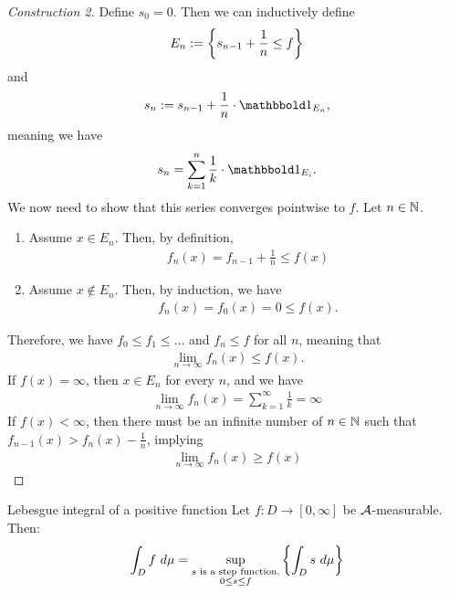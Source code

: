 \begin{proof}[Construction 2]
	Define $s_0 = 0$. Then we can inductively define
	\begin{align*}
		E_n := \qty{s_{n-1} + \frac{1}{n} \leq f}
	\end{align*}
	and
	\begin{align*}
		s_n := s_{n-1} + \frac{1}{n} \cdot \boldone_{E_n},
	\end{align*}
	meaning we have
	\begin{align*}
		s_n = \sum_{k = 1}^n \frac{1}{k} \cdot \boldone_{E_i}.
	\end{align*}
	We now need to show that this series converges pointwise to $f$. Let $n \in \mathbb{N}$.
	\begin{enumerate}
		\item Assume $x \in E_n$. Then, by definition, 
		\begin{align*}
			f_n(x) = f_{n - 1} + \frac{1}{n} \leq f(x)
		\end{align*}
		\item Assume $x \notin E_n$. Then, by induction, we have
		\begin{align*}
			f_n(x) = f_{0}(x) = 0 \leq f(x).
		\end{align*}
	\end{enumerate}
	Therefore, we have $f_0 \leq f_1 \leq \hdots$ and $f_n \leq f$ for all $n$, meaning that
	\begin{align*}
		\lim_{n \to \infty} f_n(x) \leq f(x).
	\end{align*}
	If $f(x) = \infty$, then $x \in E_n$ for every $n$, and we have
	\begin{align*}
		\lim_{n \to \infty} f_n(x) = \sum_{k = 1}^\infty \frac{1}{k} = \infty
	\end{align*}
	If $f(x) < \infty$, then there must be an infinite number of $n \in \mathbb{N}$ such that $f_{n-1}(x) > f_n(x) - \frac{1}{n}$, implying
	\begin{align*}
		\lim_{n \to \infty} f_n(x) \geq f(x)
	\end{align*}
\end{proof}
\begin{importantdefinition}{Lebesgue integral of a positive function}{}
	Let $f : D \to [0,\infty]$ be $\mathcal{A}$-measurable. Then:
	\begin{align*}
		\int_D f ~d\mu = \sup_{\substack{\textnormal{$s$ is a step function,}\\0 \leq s \leq f}}\qty{\int_D s ~d\mu}
	\end{align*}
\end{importantdefinition}
